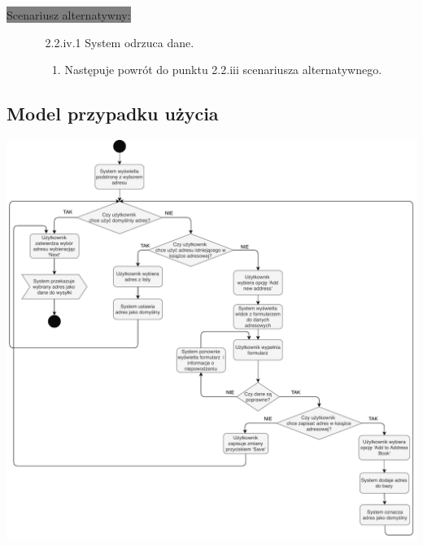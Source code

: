 \documentclass[10pt]{report}
\begin{document}
			\colorbox{grey}{Scenariusz alternatywny:}
			\begin{enumerate}\addtocounter{enumi}{2}
				\item[]
				\begin{enumerate}
					\item[2.2.iv.1] System odrzuca dane.
					\begin{enumerate}
						\item Następuje powrót do punktu 2.2.iii scenariusza alternatywnego.
					\end{enumerate}
				\end{enumerate}
			\end{enumerate}
			 
			
		\subsection{Model przypadku użycia}
			\begin{center}
				\includegraphics[width=400pt]{wysylka.pdf}
			\end{center}
			 
	
	\newpage
	
\end{document}

